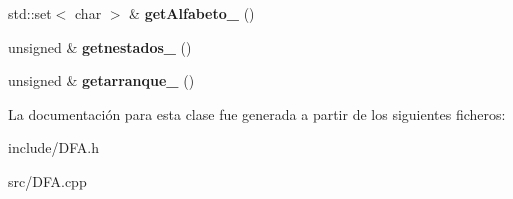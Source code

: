 \begin{DoxyCompactItemize}
\item 
\mbox{\label{class_cy_a_1_1_d_f_a_a999e0a396be747ab466bf4a8c97230d2}} 
std\+::set$<$ char $>$ \& {\bfseries get\+Alfabeto\+\_\+} ()
\item 
\mbox{\label{class_cy_a_1_1_d_f_a_ae5b9198e9e2676f25d1c1ff60172a494}} 
unsigned \& {\bfseries getnestados\+\_\+} ()
\item 
\mbox{\label{class_cy_a_1_1_d_f_a_ac83c5a6a78fcbf634936888ca53051bf}} 
unsigned \& {\bfseries getarranque\+\_\+} ()
\end{DoxyCompactItemize}


La documentación para esta clase fue generada a partir de los siguientes ficheros\+:\begin{DoxyCompactItemize}
\item 
include/D\+F\+A.\+h\item 
src/D\+F\+A.\+cpp\end{DoxyCompactItemize}
